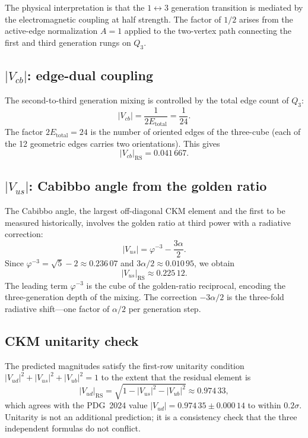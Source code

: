 \documentclass[11pt]{article}
\theoremstyle{remark}
\newcommand{\phig}{\varphi}
\newcommand{\Etot}{E_{\mathrm{total}}}
\begin{document}
The physical interpretation is that the $1\leftrightarrow 3$
generation transition is mediated by the electromagnetic
coupling at half strength.  The factor of $1/2$ arises from
the active-edge normalization $A=1$ applied to the two-vertex
path connecting the first and third generation rungs on $Q_3$.

\subsection{$|V_{cb}|$: edge-dual coupling}

The second-to-third generation mixing is controlled by the
total edge count of $Q_3$:
\begin{equation}\label{eq:Vcb}
  |V_{cb}| = \frac{1}{2\Etot} = \frac{1}{24}.
\end{equation}
The factor $2\Etot=24$ is the number of oriented edges of the
three-cube (each of the 12 geometric edges carries two
orientations).  This gives
\[
  |V_{cb}|_{\mathrm{RS}} = 0.041\,667.
\]

\subsection{$|V_{us}|$: Cabibbo angle from the golden ratio}

The Cabibbo angle, the largest off-diagonal CKM element and the
first to be measured historically, involves the golden ratio
at third power with a radiative correction:
\begin{equation}\label{eq:Vus}
  |V_{us}| = \phig^{-3} - \frac{3\alpha}{2}.
\end{equation}
Since $\phig^{-3} = \sqrt{5}-2 \approx 0.236\,07$
and $3\alpha/2 \approx 0.010\,95$, we obtain
\[
  |V_{us}|_{\mathrm{RS}} \approx 0.225\,12.
\]
The leading term $\phig^{-3}$ is the cube of the golden-ratio
reciprocal, encoding the three-generation depth of the mixing.
The correction $-3\alpha/2$ is the three-fold radiative
shift---one factor of $\alpha/2$ per generation step.

\subsection{CKM unitarity check}

The predicted magnitudes satisfy the first-row unitarity
condition $|V_{ud}|^2 + |V_{us}|^2 + |V_{ub}|^2 = 1$ to the
extent that the residual element is
\[
  |V_{ud}|_{\mathrm{RS}}
  = \sqrt{1 - |V_{us}|^2 - |V_{ub}|^2}
  \approx 0.974\,33,
\]
which agrees with the PDG~2024 value
$|V_{ud}|=0.974\,35 \pm 0.000\,14$ to within $0.2\sigma$.
Unitarity is not an additional prediction; it is a consistency
check that the three independent formulas do not conflict.
\end{document}
